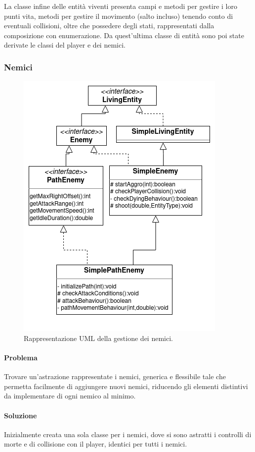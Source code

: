 \documentclass[a4paper,12pt]{report}
\begin{document}
La classe infine delle entità viventi presenta campi e metodi per gestire i loro punti vita, metodi per gestire il movimento (salto incluso)  tenendo conto di eventuali collisioni, oltre che possedere degli stati, rappresentati dalla composizione con enumerazione. Da quest’ultima classe di entità sono poi state derivate le classi del player e dei nemici.

\subsubsection{Nemici}

\begin{figure}[H]
\centering{}
\includegraphics[scale=0.7] {img/enemies.png}
\caption{Rappresentazione UML della gestione dei nemici.}
\label{img:enemies}
\end{figure}

\paragraph{Problema} Trovare un’astrazione rappresentate i nemici, generica e flessibile tale che permetta facilmente di aggiungere nuovi nemici, riducendo gli elementi distintivi da implementare di ogni nemico al minimo.

\paragraph{Soluzione} Inizialmente creata una sola classe per i nemici, dove si sono astratti i controlli di morte e di collisione con il player, identici per tutti i nemici. 
\end{document}
